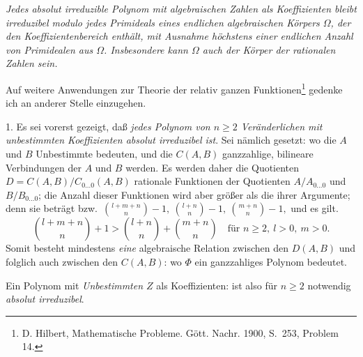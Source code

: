 \emph{Jedes absolut irreduzible Polynom mit algebraischen Zahlen als Koeffizienten bleibt irreduzibel modulo jedes Primideals eines endlichen algebraischen Körpers $\Omega$, der den Koeffizientenbereich enthält, mit Ausnahme höchstens einer endlichen Anzahl von Primidealen aus $\Omega$. Insbesondere kann $\Omega$ auch der Körper der rationalen Zahlen sein.}

Auf weitere Anwendungen zur Theorie der relativ ganzen Funktionen\footnote{D. Hilbert, Mathematische Probleme. Gött. Nachr. 1900, S.~253, Problem 14.} gedenke ich an anderer Stelle einzugehen.

1. Es sei vorerst gezeigt, daß \emph{jedes Polynom von $n\ge2$ Veränderlichen mit unbestimmten Koeffizienten absolut irreduzibel ist}. Sei nämlich gesetzt:
wo die $A$ und $B$ Unbestimmte bedeuten, und die $C(A,B)$ ganzzahlige, bilineare Verbindungen der $A$ und $B$ werden. Es werden daher die Quotienten $D=C(A,B)/C_{0\ldots0}(A,B)$
rationale Funktionen der Quotienten $A/A_{0\ldots0}$ und $B/B_{0\ldots0}$; die Anzahl dieser Funktionen wird aber größer als die ihrer Argumente; denn sie beträgt bzw.\ $\binom{l+m+n}{n}-1,\ \binom{l+n}{n}-1,\ \binom{m+n}{n}-1,$ und es gilt.
\[
\binom{l+m+n}{n}+1>
\binom{l+n}{n}+\binom{m+n}{n}
\quad\text{für } n\ge2,\ l>0,\ m>0.
\]
Somit besteht mindestens \emph{eine} algebraische Relation zwischen den $D(A,B)$ und folglich auch zwischen den $C(A,B)$:
wo $\Phi$ ein ganzzahliges Polynom bedeutet.

Ein Polynom mit \emph{Unbestimmten $Z$} als Koeffizienten:
ist also für $n\ge2$ notwendig \emph{absolut irreduzibel}.\addtocounter{footnote}{1}

